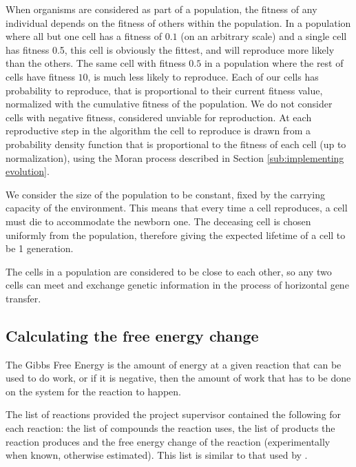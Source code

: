 \documentclass[a4paper,12pt]{article}
\begin{document}
	When organisms are considered as part of a population, the fitness of any individual depends on the fitness of others within the population. In a population where all but one cell has a fitness of $0.1$ (on an arbitrary scale) and a single cell has fitness 0.5, this cell is obviously the fittest, and will reproduce more likely than the others. The same cell with fitness $0.5$ in a population where the rest of cells have fitness $10$, is much less likely to reproduce. Each of our cells has probability to reproduce, that is proportional to their current fitness value, normalized with the cumulative fitness of the population. We do not consider cells with negative fitness, considered unviable for reproduction. At each reproductive step in the algorithm the cell to reproduce is drawn from a probability density function that is proportional to the fitness of each cell (up to normalization), using the Moran process described in Section \ref{sub:implementing evolution}.


	We consider the size of the population to be constant, fixed by the carrying capacity of the environment. This means that every time a cell reproduces, a cell must die to accommodate the newborn one. The deceasing cell is chosen uniformly from the population, therefore giving the expected lifetime of a cell to be 1 generation.

	The cells in a population are considered to be close to each other, so  any two cells can meet and exchange genetic information in the process of horizontal gene transfer.

\subsection{Calculating the free energy change}
\label{sub:The free energy change}

	The Gibbs Free Energy is the amount of energy at a given reaction that can be used to do work, or if it is negative, then the amount of work that has to be done on the system for the reaction to happen. 


	The list of reactions provided the project supervisor contained the following for each reaction: the list of compounds the reaction uses, the list of products the reaction produces and the free energy change of the reaction (experimentally when known, otherwise estimated). This list is similar to that used by \cite{BartekLower}.
	
\end{document}
